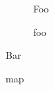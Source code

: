 \documentclass{article}
\begin{document}
\lipsum[1-3]

\begin{figure}[h] Foo \caption{foo}
\end{figure}

\begin{table}[h] Bar \caption{bar}
\end{table}

\begin{map}[h] map \caption{map}
\end{map}

\lipsum[4-6]
\end{document}
